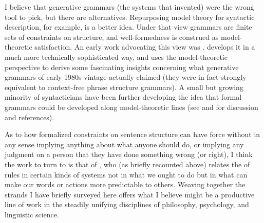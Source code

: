 \documentclass[output=paper]{langscibook}
\begin{document}
I believe that generative grammars (the systems that {\Post} invented) were the wrong tool to pick, but there are alternatives.  Repurposing model theory for syntactic description, for example, is a better idea. Under that view grammars are finite sets of constraints on structure, and well-formedness is construed as model-theoretic satisfaction. An early work advocating this view was \citet{JohnPost80}. \citet{Rogers98} develops it in a much more technically sophisticated way, and uses the model-theoretic perspective to derive some fascinating insights concerning what generative grammars of early 1980s vintage actually claimed (they were in fact strongly equivalent to context-free phrase structure grammars). A small but growing minority of syntacticians have been further developing the idea that formal grammars could be developed along model-theoretic lines (see \citealt{PullScho01LACL} and \citealt{Pullum13} for discussion and references).

As to how formalized constraints on sentence structure can have  force without in any sense implying anything about what anyone should do, or implying any judgment on a person that they have done something wrong (or right), I think the work to turn to is that of \citet{Millar04}, who (as briefly recounted above) relates the  of rules in certain kinds of systems not in what we ought to do but in what can make our words or actions more predictable to others. Weaving together the strands I have briefly surveyed here offers what I believe might be a productive line of work in the steadily unifying disciplines of philosophy, psychology, and linguistic science.

\sloppy
\printbibliography[heading=subbibliography,notkeyword=this]
\end{document}
